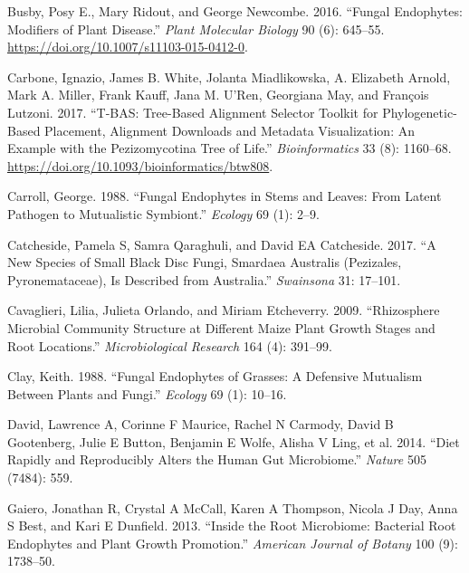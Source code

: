 \documentclass[fleqn,10pt,lineno]{wlpeerj} %
\newlength{\cslhangindent}
\newenvironment{CSLReferences}[2] %
 {%
  \setlength{\parindent}{0pt}
  \ifodd #1 \everypar{\setlength{\hangindent}{\cslhangindent}}\ignorespaces\fi
  \ifnum #2 > 0
  \setlength{\parskip}{#2\baselineskip}
  \fi
 }%
 {}
\begin{document}
\begin{CSLReferences}{1}{0}
\leavevmode{}%
Busby, Posy E., Mary Ridout, and George Newcombe. 2016. {``Fungal Endophytes: Modifiers of Plant Disease.''} \emph{Plant Molecular Biology} 90 (6): 645--55. \url{https://doi.org/10.1007/s11103-015-0412-0}.

\leavevmode{}%
Carbone, Ignazio, James B. White, Jolanta Miadlikowska, A. Elizabeth Arnold, Mark A. Miller, Frank Kauff, Jana M. U'Ren, Georgiana May, and François Lutzoni. 2017. {``T-BAS: Tree-Based Alignment Selector Toolkit for Phylogenetic-Based Placement, Alignment Downloads and Metadata Visualization: An Example with the Pezizomycotina Tree of Life.''} \emph{Bioinformatics} 33 (8): 1160--68. \url{https://doi.org/10.1093/bioinformatics/btw808}.

\leavevmode{}%
Carroll, George. 1988. {``Fungal Endophytes in Stems and Leaves: From Latent Pathogen to Mutualistic Symbiont.''} \emph{Ecology} 69 (1): 2--9.

\leavevmode{}%
Catcheside, Pamela S, Samra Qaraghuli, and David EA Catcheside. 2017. {``A New Species of Small Black Disc Fungi, Smardaea Australis (Pezizales, Pyronemataceae), Is Described from Australia.''} \emph{Swainsona} 31: 17--101.

\leavevmode{}%
Cavaglieri, Lilia, Julieta Orlando, and Miriam Etcheverry. 2009. {``Rhizosphere Microbial Community Structure at Different Maize Plant Growth Stages and Root Locations.''} \emph{Microbiological Research} 164 (4): 391--99.

\leavevmode{}%
Clay, Keith. 1988. {``Fungal Endophytes of Grasses: A Defensive Mutualism Between Plants and Fungi.''} \emph{Ecology} 69 (1): 10--16.

\leavevmode{}%
David, Lawrence A, Corinne F Maurice, Rachel N Carmody, David B Gootenberg, Julie E Button, Benjamin E Wolfe, Alisha V Ling, et al. 2014. {``Diet Rapidly and Reproducibly Alters the Human Gut Microbiome.''} \emph{Nature} 505 (7484): 559.

\leavevmode{}%
Gaiero, Jonathan R, Crystal A McCall, Karen A Thompson, Nicola J Day, Anna S Best, and Kari E Dunfield. 2013. {``Inside the Root Microbiome: Bacterial Root Endophytes and Plant Growth Promotion.''} \emph{American Journal of Botany} 100 (9): 1738--50.


\end{CSLReferences}
\end{document}
